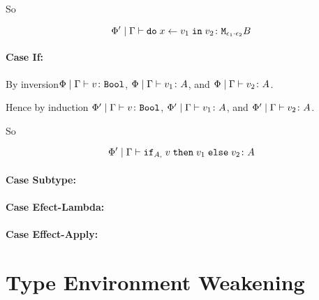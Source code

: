 \documentclass{report}
\newcommand{\case}[1]{\paragraph{Case #1:}}
\newcommand\bi[0]{By inversion}
\begin{document}
So

\begin{equation}
    \Phi'\mid\Gamma \vdash \texttt{do}\; x \leftarrow v_1 \;\texttt{in}\; v_2 \colon \texttt{M}_{\epsilon_1\cdot\epsilon_2}{B}
\end{equation}

\case{If}

\bi $\Phi\mid\Gamma \vdash v \colon \texttt{Bool}$, $\Phi\mid\Gamma \vdash v_1 \colon A$, and $\Phi\mid\Gamma \vdash v_2 \colon A$.

Hence by induction
$\Phi'\mid\Gamma \vdash v \colon \texttt{Bool}$, $\Phi'\mid\Gamma \vdash v_1 \colon A$, and $\Phi'\mid\Gamma \vdash v_2 \colon A$.

So 

\begin{equation}
    \Phi'\mid\Gamma \vdash \texttt{if}_{A, }\; v\; \texttt{then}\; v_1 \;\texttt{else} \; v_2 \colon A
\end{equation}

\case{Subtype}

\case{Efect-Lambda}

\case{Effect-Apply}

\section{Type Environment Weakening}
\end{document}
